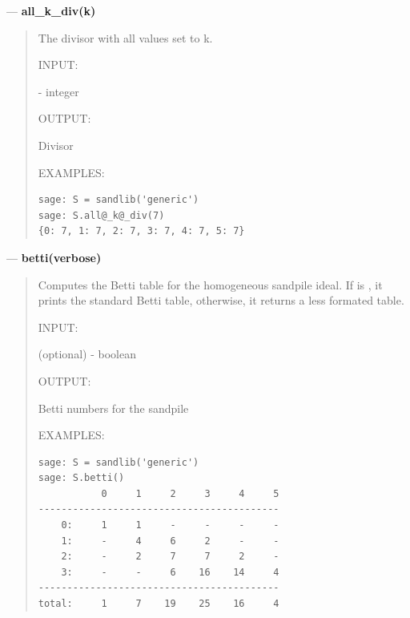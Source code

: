 \documentclass[letterpaper,10pt,english]{manual}
\begin{document}
---
\hypertarget{all-k-div-k}{}
\textbf{all\_k\_div(k)}
\begin{quote}

The divisor with all values set to k.

INPUT:

 - integer

OUTPUT:

Divisor

EXAMPLES:

\begin{Verbatim}[commandchars=@\[\]]
sage: S = sandlib('generic')
sage: S.all@_k@_div(7)
{0: 7, 1: 7, 2: 7, 3: 7, 4: 7, 5: 7}
\end{Verbatim}
\end{quote}

---
\hypertarget{betti-verbose}{}
\textbf{betti(verbose)}
\begin{quote}

Computes the Betti table for the homogeneous sandpile ideal.  If
 is , it prints the standard Betti table, otherwise,
it returns a less formated table.

INPUT:

 (optional) - boolean

OUTPUT:

Betti numbers for the sandpile

EXAMPLES:

\begin{Verbatim}[commandchars=@\[\]]
sage: S = sandlib('generic')
sage: S.betti()
           0     1     2     3     4     5
------------------------------------------
    0:     1     1     -     -     -     -
    1:     -     4     6     2     -     -
    2:     -     2     7     7     2     -
    3:     -     -     6    16    14     4
------------------------------------------
total:     1     7    19    25    16     4
\end{Verbatim}
\end{quote}
\end{document}

